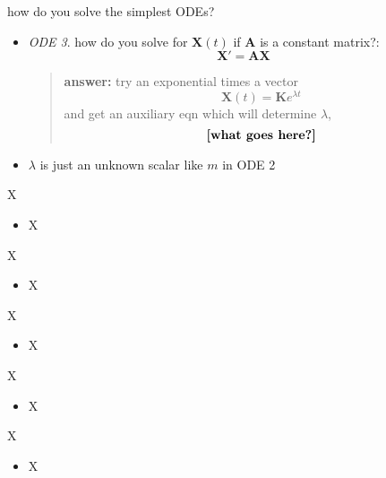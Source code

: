 \documentclass[urlcolor=blue,dvipsnames]{beamer}
\newcommand{\bA}{\mathbf{A}}
\newcommand{\bK}{\mathbf{K}}
\newcommand{\bX}{\mathbf{X}}
\begin{document}
\begin{frame}{how do you solve the simplest ODEs?}

\begin{itemize}
\item \emph{ODE 3}.  how do you solve for $\bX(t)$ if $\bA$ is a constant matrix?:
    $$\bX' = \bA \bX$$
    \begin{quote}
    \textbf{answer:}  try an exponential times a vector
        $$\bX(t) = \bK e^{\lambda t}$$
    and get an auxiliary eqn which will determine $\lambda$,
        $$\text{\textbf{[what goes here?]}}$$
    \end{quote}
\item $\lambda$ is just an unknown scalar like $m$ in ODE 2
\end{itemize}
\end{frame}


\begin{frame}{X}

\begin{itemize}
\item X
\end{itemize}
\end{frame}


\begin{frame}{X}

\begin{itemize}
\item X
\end{itemize}
\end{frame}


\begin{frame}{X}

\begin{itemize}
\item X
\end{itemize}
\end{frame}


\begin{frame}{X}

\begin{itemize}
\item X
\end{itemize}
\end{frame}


\begin{frame}{X}

\begin{itemize}
\item X
\end{itemize}
\end{frame}
\end{document}
